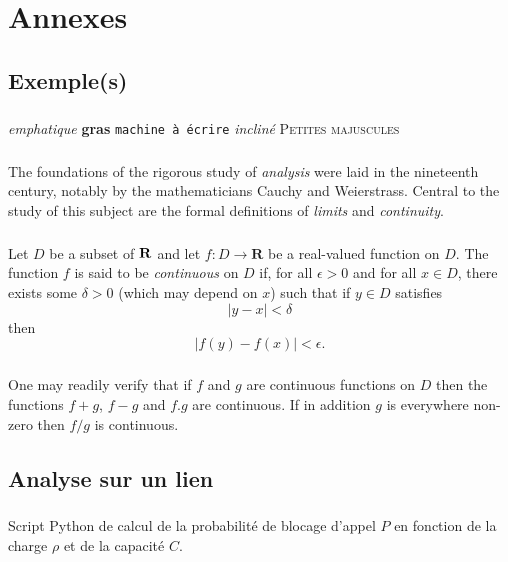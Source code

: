 %
\appendix{}
%
\chapter{Annexes}
%
    \section{Exemple(s)}
%
        \paragraph{}
\emph{emphatique}
\textbf{gras}
\texttt{machine à écrire}
\textsl{incliné}
\textsc{Petites majuscules}
%
        \paragraph{}
The foundations of the rigorous study of \emph{analysis}
were laid in the nineteenth century, notably by the
mathematicians Cauchy and Weierstrass. Central to the
study of this subject are the formal definitions of
\emph{limits} and \emph{continuity}.
%
        \paragraph{}
Let $D$ be a subset of $\bf R$ and let
$f \colon D \to \mathbf{R}$ be a real-valued function on
$D$. The function $f$ is said to be \emph{continuous} on
$D$ if, for all $\epsilon > 0$ and for all $x \in D$,
there exists some $\delta > 0$ (which may depend on $x$)
such that if $y \in D$ satisfies
\[ |y - x| < \delta \]
then
\[ |f(y) - f(x)| < \epsilon. \]
%
        \paragraph{}
One may readily verify that if $f$ and $g$ are continuous
functions on $D$ then the functions $f+g$, $f-g$ and
$f.g$ are continuous. If in addition $g$ is everywhere
non-zero then $f/g$ is continuous.
%
    \clearpage
%
%
%
    \section{Analyse sur un lien}
%
        \paragraph{}
            \label{seullien-script}
Script Python de calcul de la probabilité de blocage d'appel $P$ en fonction de la charge $\rho$ et de la capacité $C$.

    \clearpage
%
